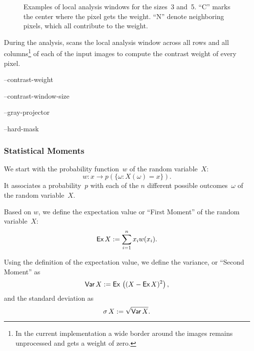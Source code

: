 \begin{figure}[htbp]
  \begin{maxipage}
    \centering
  \end{maxipage}

  \caption[Local analysis window]{\label{fig:local-analysis-window}Examples of local analysis
    windows for the sizes~3 and~5.  ``\textsf{C}'' marks the center where the pixel gets the
    weight.  ``\textsf{N}'' denote neighboring pixels, which all contribute to the weight.}
\end{figure}


During the analysis, \App{} scans the local analysis window across all rows and all
columns\footnote{In the current implementation a  wide
  border around the images remains unprocessed and gets a weight of zero.} of each of the input
images to compute the contrast weight of every pixel.

\begin{optionsummary}
\item[--contrast-weight] \sectionName~
\item[--contrast-window-size] \sectionName~
\item[--gray-projector] \sectionName~
\item[--hard-mask] \sectionName~
\end{optionsummary}


\subsubsection[Statistical Moments]{\label{sec:statistical-moments}%
  Statistical Moments}

%
%
We start with the probability function~$w$ of the random variable~$X$:
\[
    w: x \rightarrow p(\{\omega: X(\omega) = x\}).
\]
\noindent It associates a probability~$p$ with each of the $n$ different possible
outcomes~$\omega$ of the random variable~$X$.

%
%
%
Based on $w$, we define the expectation value or ``First Moment'' of the random variable~$X$:
\[
    \textsf{Ex}\, X := \sum_{i = 1}^n x_i w(x_i).
\]

%
%
%
Using the definition of the expectation value, we define the
variance, or ``Second Moment'' as
\[
    \textsf{Var}\, X := \mbox{\textsf{Ex}\,}\left( (X - \textsf{Ex}\, X)^2 \right),
\]
%
\noindent and the standard deviation as
\[
    \sigma \, X := \sqrt{\textsf{Var}\, X}.
\]

